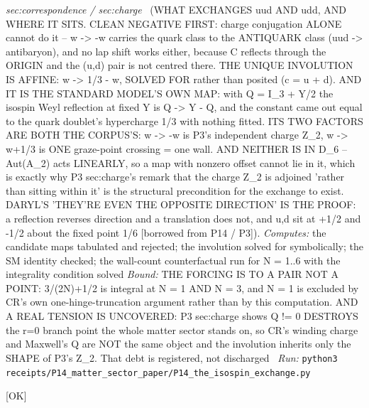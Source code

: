 \begin{description}
\textit{sec:correspondence / sec:charge} \ (WHAT EXCHANGES uud AND udd, AND WHERE IT SITS. CLEAN NEGATIVE FIRST: charge conjugation ALONE cannot do it -- w -> -w carries the quark class to the ANTIQUARK class (uud -> antibaryon), and no lap shift works either, because C reflects through the ORIGIN and the (u,d) pair is not centred there. THE UNIQUE INVOLUTION IS AFFINE: w -> 1/3 - w, SOLVED FOR rather than posited (c = u + d). AND IT IS THE STANDARD MODEL'S OWN MAP: with Q = I\_3 + Y/2 the isospin Weyl reflection at fixed Y is Q -> Y - Q, and the constant came out equal to the quark doublet's hypercharge 1/3 with nothing fitted. ITS TWO FACTORS ARE BOTH THE CORPUS'S: w -> -w is P3's independent charge Z\_2, w -> w+1/3 is ONE graze-point crossing = one wall. AND NEITHER IS IN D\_6 -- Aut(A\_2) acts LINEARLY, so a map with nonzero offset cannot lie in it, which is exactly why P3 sec:charge's remark that the charge Z\_2 is adjoined 'rather than sitting within it' is the structural precondition for the exchange to exist. DARYL'S 'THEY'RE EVEN THE OPPOSITE DIRECTION' IS THE PROOF: a reflection reverses direction and a translation does not, and u,d sit at +1/2 and -1/2 about the fixed point 1/6 [borrowed from P14 / P3]). 
\emph{Computes:} the candidate maps tabulated and rejected; the involution solved for symbolically; the SM identity checked; the wall-count counterfactual run for N = 1..6 with the integrality condition solved
 \emph{Bound:} THE FORCING IS TO A PAIR NOT A POINT: 3/(2N)+1/2 is integral at N = 1 AND N = 3, and N = 1 is excluded by CR's own one-hinge-truncation argument rather than by this computation. AND A REAL TENSION IS UNCOVERED: P3 sec:charge shows Q != 0 DESTROYS the r=0 branch point the whole matter sector stands on, so CR's winding charge and Maxwell's Q are NOT the same object and the involution inherits only the SHAPE of P3's Z\_2. That debt is registered, not discharged
\ \emph{Run:} \texttt{python3 receipts/P14\_matter\_sector\_paper/P14\_the\_isospin\_exchange.py}
\item[\rcptlabel{P03_transverse_space_is_round}{P3R43}\textbf{P3R43}\quad\texttt{P03\_transverse\_space\_is\_round}]\hfill\textsf{[OK]}\\

\end{description}
